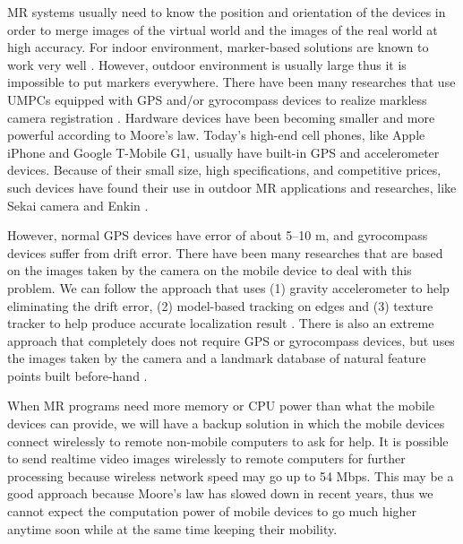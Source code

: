 MR systems usually need to know the position and orientation of the devices in order to merge images of the virtual world and the images of the real world at high accuracy. For indoor environment, marker-based solutions are known to work very well \cite{Reference20}. However, outdoor environment is usually large thus it is impossible to put markers everywhere. There have been many researches that use UMPCs equipped with GPS and/or gyrocompass devices to realize markless camera registration \cite{Reference2} \cite{Reference4} \cite{Reference13}. Hardware devices have been becoming smaller and more powerful according to Moore's law. Today's high-end cell phones, like Apple iPhone and Google T-Mobile G1, usually have built-in GPS and accelerometer devices. Because of their small size, high specifications, and competitive prices, such devices have found their use in outdoor MR applications and researches, like Sekai camera \cite{Reference18} and Enkin \cite{Reference19}.

However, normal GPS devices have error of about 5--10 m, and gyrocompass devices suffer from drift error. There have been many researches that are based on the images taken by the camera on the mobile device to deal with this problem. We can follow the approach that uses (1) gravity accelerometer to help eliminating the drift error, (2) model-based tracking on edges and (3) texture tracker to help produce accurate localization result \cite{Reference13}. There is also an extreme approach that completely does not require GPS or gyrocompass devices, but uses the images taken by the camera and a landmark database of natural feature points built before-hand \cite{Reference21}.

When MR programs need more memory or CPU power than what the mobile devices can provide, we will have a backup solution in which the mobile devices connect wirelessly to remote non-mobile computers to ask for help. It is possible to send realtime video images wirelessly to remote computers for further processing because wireless network speed may go up to 54 Mbps. This may be a good approach because Moore's law has slowed down in recent years, thus we cannot expect the computation power of mobile devices to go much higher anytime soon while at the same time keeping their mobility.

